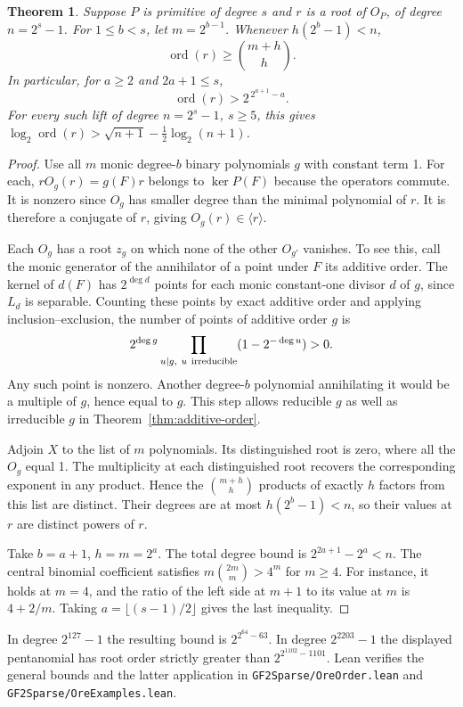 \documentclass[11pt]{article}
\newtheorem{theorem}{Theorem}
\newcommand{\ord}{\operatorname{ord}}
\begin{document}
\begin{theorem}\label{thm:ore-order}
Suppose \(P\) is primitive of degree \(s\) and \(r\) is a root
of \(O_P\), of degree \(n=2^s-1\). For \(1\le b<s\), let
\(m=2^{b-1}\). Whenever \(h(2^b-1)<n\),
\[
                       \ord(r)\ge {m+h\choose h}.
\]
In particular, for \(a\ge2\) and \(2a+1\le s\),
\[
                       \ord(r)>2^{\,2^{a+1}-a}.
\]
For every such lift of degree \(n=2^s-1\), \(s\ge5\), this gives
\(\log_2\ord(r)>\sqrt{n+1}-\tfrac12\log_2(n+1)\).
\end{theorem}
\begin{proof}
Use all \(m\) monic degree-\(b\) binary polynomials \(g\) with
constant term 1. For each, \(r O_g(r)=g(F)r\) belongs to
\(\ker P(F)\) because the operators commute. It is nonzero since
\(O_g\) has smaller degree than the minimal polynomial of \(r\).
It is therefore a conjugate of \(r\), giving
\(O_g(r)\in\langle r\rangle\).

Each \(O_g\) has a root \(z_g\) on which none of the other \(O_{g'}\)
vanishes. To see this, call the monic generator of the annihilator
of a point under \(F\) its additive order. The kernel of \(d(F)\)
has \(2^{\deg d}\) points for each monic constant-one divisor \(d\)
of \(g\), since \(L_d\) is separable. Counting these points by exact
additive order and applying inclusion--exclusion, the number of
points of additive order \(g\) is
\[
          2^{\deg g}\prod_{u\mid g,\ u\ {\rm irreducible}}
                              (1-2^{-\deg u})>0 .
\]
Any such point is nonzero. Another degree-\(b\) polynomial annihilating
it would be a multiple of \(g\), hence equal to \(g\).
This step allows reducible \(g\) as well as irreducible \(g\) in
Theorem~\ref{thm:additive-order}.

Adjoin \(X\) to the list of \(m\) polynomials. Its distinguished root
is zero, where all the \(O_g\) equal 1. The multiplicity at each
distinguished root recovers the corresponding exponent in any product.
Hence the \(\binom{m+h}{h}\) products of exactly \(h\) factors from
this list are distinct. Their degrees are at most \(h(2^b-1)<n\), so
their values at \(r\) are distinct powers of \(r\).

Take \(b=a+1\), \(h=m=2^a\). The total degree bound is
\(2^{2a+1}-2^a<n\). The central binomial coefficient satisfies
\(m\binom{2m}{m}>4^m\) for \(m\ge4\).
For instance, it holds at \(m=4\), and the ratio of the left side
at \(m+1\) to its value at \(m\) is \(4+2/m\).
Taking \(a=\lfloor(s-1)/2\rfloor\) gives the last inequality.
\end{proof}
In degree \(2^{127}-1\) the resulting bound is
\(2^{2^{64}-63}\). In degree \(2^{2203}-1\) the displayed
pentanomial has root order strictly greater than \(2^{2^{1102}-1101}\).
Lean verifies the general bounds and the latter application in
\nolinkurl{GF2Sparse/OreOrder.lean} and \nolinkurl{GF2Sparse/OreExamples.lean}.
\end{document}
